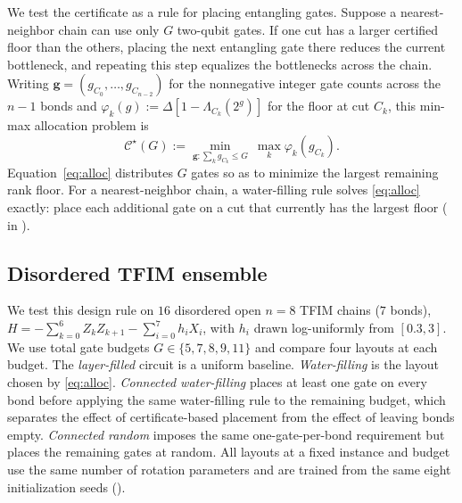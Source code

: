 \documentclass[reprint,aps,pra,floatfix,superscriptaddress,nofootinbib,longbibliography]{revtex4-2}
\theoremstyle{remark}
\theoremstyle{definition}
\newcommand{\calC}{\mathcal{C}}
\begin{document}
We test the certificate as a rule for placing entangling gates. Suppose a nearest-neighbor chain can use only $G$ two-qubit
gates. If one cut has a larger certified floor than the others, placing the next
entangling gate there reduces the current bottleneck, and repeating this step
equalizes the bottlenecks across the chain. Writing $\mathbf{g}=(g_{C_0},\dots,g_{C_{n-2}})$ for the nonnegative integer
gate counts across the $n-1$ bonds and
$\varphi_k(g):=\Delta[1-\Lambda_{C_k}(2^g)]$ for the floor at cut $C_k$, this
min-max allocation problem is
\begin{equation}
  \label{eq:alloc}
  \calC^\star(G):=\min_{\mathbf{g}:\sum_k g_{C_k}\le G}\ \max_k\varphi_k(g_{C_k}).
\end{equation}
Equation~\eqref{eq:alloc} distributes $G$ gates so as to minimize the largest
remaining rank floor. For a nearest-neighbor chain, a water-filling rule solves
\eqref{eq:alloc} exactly: place each additional gate on a cut that currently has
the largest floor ( in ).

\subsection{Disordered TFIM ensemble}
\label{sec:alloc-negative}

We test this design rule on $16$ disordered open $n=8$ TFIM chains ($7$ bonds),
$H=-\sum_{k=0}^{6}Z_kZ_{k+1}-\sum_{i=0}^{7}h_iX_i$, with $h_i$ drawn
log-uniformly from $[0.3,3]$. We use total gate budgets $G\in\{5,7,8,9,11\}$
and compare four layouts at each budget. The \emph{layer-filled} circuit is a uniform baseline. \emph{Water-filling} is
the layout chosen by \eqref{eq:alloc}. \emph{Connected water-filling} places at
least one gate on every bond before applying the same water-filling rule to the
remaining budget, which separates the effect of certificate-based placement from
the effect of leaving bonds empty. \emph{Connected random} imposes the same
one-gate-per-bond requirement but places the remaining gates at random. All
layouts at a fixed instance and budget use the same number of rotation parameters
and are trained from the same eight initialization seeds ().
\end{document}
